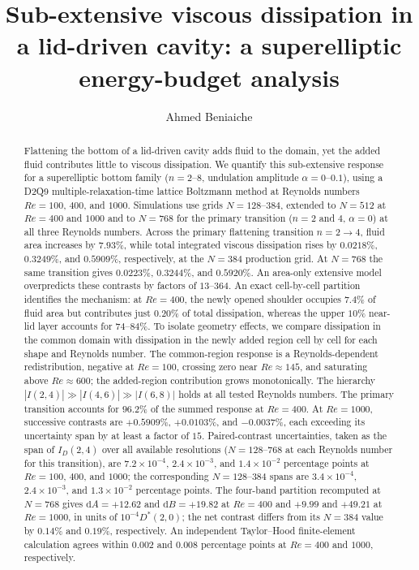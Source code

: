 \documentclass[aip,pof,reprint]{revtex4-2}
\begin{document}
\title{Sub-extensive viscous dissipation in a lid-driven cavity: a superelliptic energy-budget analysis}

\author{Ahmed Beniaiche}

\begin{abstract}
Flattening the bottom of a lid-driven cavity adds fluid to the domain, yet the added fluid contributes little to viscous dissipation. We quantify this sub-extensive response for a superelliptic bottom family ($n=2$--$8$, undulation amplitude $\alpha=0$--$0.1$), using a D2Q9 multiple-relaxation-time lattice Boltzmann method at Reynolds numbers $Re=100$, $400$, and $1000$. Simulations use grids $N=128$--$384$, extended to $N=512$ at $Re=400$ and $1000$ and to $N=768$ for the primary transition ($n=2$ and $4$, $\alpha=0$) at all three Reynolds numbers. Across the primary flattening transition $n=2\to4$, fluid area increases by $7.93\%$, while total integrated viscous dissipation rises by $0.0218\%$, $0.3249\%$, and $0.5909\%$, respectively, at the $N=384$ production grid. At $N=768$ the same transition gives $0.0223\%$, $0.3244\%$, and $0.5920\%$. An area-only extensive model overpredicts these contrasts by factors of $13$--$364$. An exact cell-by-cell partition identifies the mechanism: at $Re=400$, the newly opened shoulder occupies $7.4\%$ of fluid area but contributes just $0.20\%$ of total dissipation, whereas the upper $10\%$ near-lid layer accounts for $74$--$84\%$. To isolate geometry effects, we compare dissipation in the common domain with dissipation in the newly added region cell by cell for each shape and Reynolds number. The common-region response is a Reynolds-dependent redistribution, negative at $Re=100$, crossing zero near $Re\approx145$, and saturating above $Re\approx600$; the added-region contribution grows monotonically. The hierarchy $|I(2,4)|\gg|I(4,6)|\gg|I(6,8)|$ holds at all tested Reynolds numbers. The primary transition accounts for $96.2\%$ of the summed response at $Re=400$. At $Re=1000$, successive contrasts are $+0.5909\%$, $+0.0103\%$, and $-0.0037\%$, each exceeding its uncertainty span by at least a factor of $15$. Paired-contrast uncertainties, taken as the span of $I_D(2,4)$ over all available resolutions ($N=128$--$768$ at each Reynolds number for this transition), are $7.2\times10^{-4}$, $2.4\times10^{-3}$, and $1.4\times10^{-2}$ percentage points at $Re=100$, $400$, and $1000$; the corresponding $N=128$--$384$ spans are $3.4\times10^{-4}$, $2.4\times10^{-3}$, and $1.3\times10^{-2}$ percentage points. The four-band partition recomputed at $N=768$ gives $\mathrm{d}A=+12.62$ and $\mathrm{d}B=+19.82$ at $Re=400$ and $+9.99$ and $+49.21$ at $Re=1000$, in units of $10^{-4}D^*(2,0)$; the net contrast differs from its $N=384$ value by $0.14\%$ and $0.19\%$, respectively. An independent Taylor--Hood finite-element calculation agrees within $0.002$ and $0.008$ percentage points at $Re=400$ and $1000$, respectively.
\end{abstract}
\end{document}
